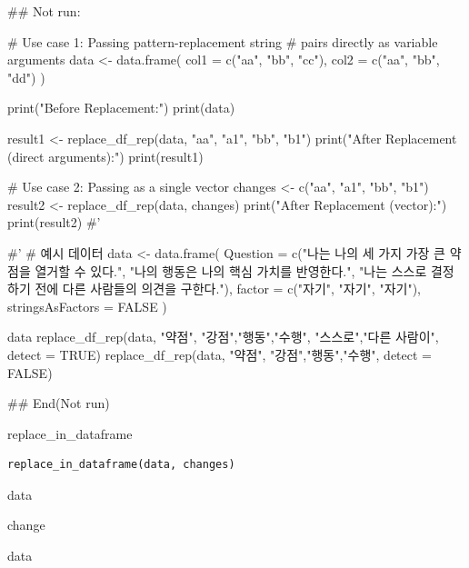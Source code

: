 \documentclass[a4paper]{book}
\begin{document}
\begin{Examples}
\begin{ExampleCode}

## Not run: 

# Use case 1: Passing pattern-replacement string
# pairs directly as variable arguments
data <- data.frame(
  col1 = c("aa", "bb", "cc"),
  col2 = c("aa", "bb", "dd")
)

print("Before Replacement:")
print(data)

result1 <- replace_df_rep(data, "aa", "a1", "bb", "b1")
print("After Replacement (direct arguments):")
print(result1)

# Use case 2: Passing as a single vector
changes <- c("aa", "a1", "bb", "b1")
result2 <- replace_df_rep(data, changes)
print("After Replacement (vector):")
print(result2)
#'

#'
# 예시 데이터
data <- data.frame(
  Question = c("나는 나의 세 가지 가장 큰 약점을 열거할 수 있다.",
   "나의 행동은 나의 핵심 가치를 반영한다.",
   "나는 스스로 결정하기 전에 다른 사람들의 의견을 구한다."),
  factor = c("자기", "자기", "자기"),
  stringsAsFactors = FALSE
)

data
replace_df_rep(data, "약점", "강점","행동","수행",
"스스로","다른 사람이",  detect = TRUE)
replace_df_rep(data, "약점",
"강점","행동","수행",  detect = FALSE)



## End(Not run)



\end{ExampleCode}
\end{Examples}
%
\begin{Description}
replace\_in\_dataframe
\end{Description}
%
\begin{Usage}
\begin{verbatim}
replace_in_dataframe(data, changes)
\end{verbatim}
\end{Usage}
%
\begin{Arguments}
\begin{ldescription}
\item[\code{data}] data

\item[\code{changes}] change
\end{ldescription}
\end{Arguments}
%
\begin{Value}
data
\end{Value}
\end{document}
